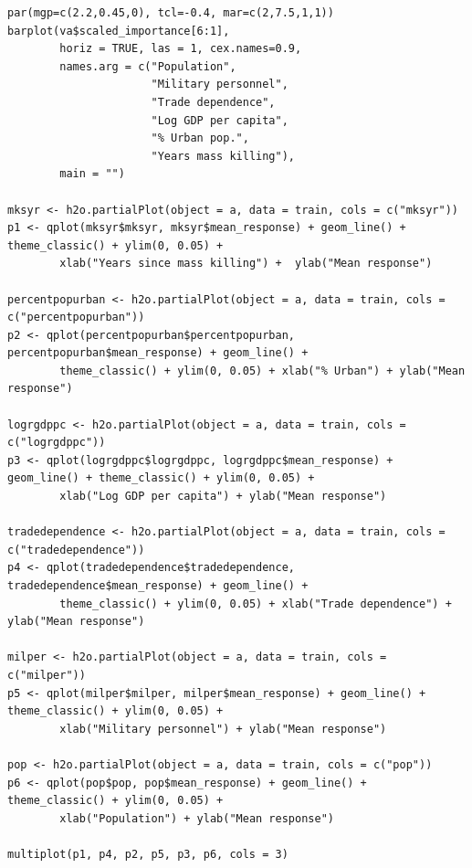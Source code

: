 \documentclass[a4paper,12pt]{article}
\begin{document}
\begin{verbatim}
par(mgp=c(2.2,0.45,0), tcl=-0.4, mar=c(2,7.5,1,1))
barplot(va$scaled_importance[6:1],
        horiz = TRUE, las = 1, cex.names=0.9,
        names.arg = c("Population", 
                      "Military personnel",
                      "Trade dependence", 
                      "Log GDP per capita",
                      "% Urban pop.",
                      "Years mass killing"),
        main = "")

mksyr <- h2o.partialPlot(object = a, data = train, cols = c("mksyr"))
p1 <- qplot(mksyr$mksyr, mksyr$mean_response) + geom_line() + theme_classic() + ylim(0, 0.05) +
        xlab("Years since mass killing") +  ylab("Mean response")
        
percentpopurban <- h2o.partialPlot(object = a, data = train, cols = c("percentpopurban"))
p2 <- qplot(percentpopurban$percentpopurban, percentpopurban$mean_response) + geom_line() +
        theme_classic() + ylim(0, 0.05) + xlab("% Urban") + ylab("Mean response")

logrgdppc <- h2o.partialPlot(object = a, data = train, cols = c("logrgdppc"))
p3 <- qplot(logrgdppc$logrgdppc, logrgdppc$mean_response) + geom_line() + theme_classic() + ylim(0, 0.05) +
        xlab("Log GDP per capita") + ylab("Mean response")

tradedependence <- h2o.partialPlot(object = a, data = train, cols = c("tradedependence"))
p4 <- qplot(tradedependence$tradedependence, tradedependence$mean_response) + geom_line() +
        theme_classic() + ylim(0, 0.05) + xlab("Trade dependence") + ylab("Mean response")

milper <- h2o.partialPlot(object = a, data = train, cols = c("milper"))
p5 <- qplot(milper$milper, milper$mean_response) + geom_line() + theme_classic() + ylim(0, 0.05) +
        xlab("Military personnel") + ylab("Mean response")

pop <- h2o.partialPlot(object = a, data = train, cols = c("pop"))
p6 <- qplot(pop$pop, pop$mean_response) + geom_line() + theme_classic() + ylim(0, 0.05) +
        xlab("Population") + ylab("Mean response")

multiplot(p1, p4, p2, p5, p3, p6, cols = 3)



\end{verbatim}
\end{document}
